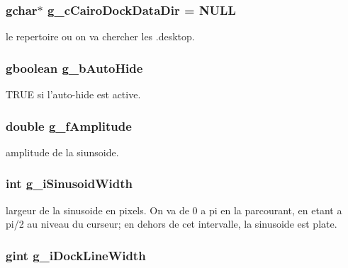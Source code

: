 \subsubsection{\setlength{\rightskip}{0pt plus 5cm}gchar$\ast$ {\bf g\_\-c\-Cairo\-Dock\-Data\-Dir} = NULL}\label{cairo-dock_8c_e8ab56da998f5b0784d5e09cdddd929b}


le repertoire ou on va chercher les .desktop. 

\subsubsection{\setlength{\rightskip}{0pt plus 5cm}gboolean {\bf g\_\-b\-Auto\-Hide}}\label{cairo-dock_8c_263de39492b5e16c81c98792f183edcf}


TRUE si l'auto-hide est active. 

\subsubsection{\setlength{\rightskip}{0pt plus 5cm}double {\bf g\_\-f\-Amplitude}}\label{cairo-dock_8c_71125a40fdc7b421002f176b9b82ac79}


amplitude de la siunsoide. 

\subsubsection{\setlength{\rightskip}{0pt plus 5cm}int {\bf g\_\-i\-Sinusoid\-Width}}\label{cairo-dock_8c_7ed10b4674d07794421af544ea9f2ad8}


largeur de la sinusoide en pixels. On va de 0 a pi en la parcourant, en etant a pi/2 au niveau du curseur; en dehors de cet intervalle, la sinusoide est plate. 

\subsubsection{\setlength{\rightskip}{0pt plus 5cm}gint {\bf g\_\-i\-Dock\-Line\-Width}}\label{cairo-dock_8c_e5d97f4f9a4f7e546af6ebe7b7d5399b}


